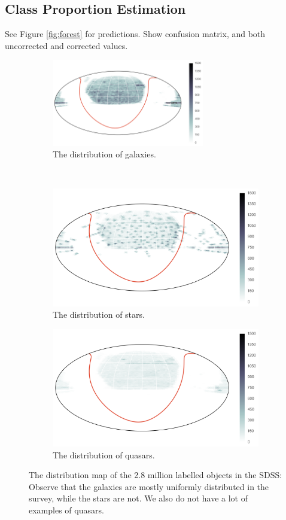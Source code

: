 \subsection{Class Proportion Estimation}
See Figure \ref{fig:forest} for predictions. Show confusion matrix, and
both uncorrected and corrected values.

\begin{figure}[p]
	\centering
	\begin{subfigure}{\textwidth}
		\centering
		\includegraphics[width=0.73\textwidth]{figures/4_expt1/sdss_train_galaxies}
		\caption{The distribution of galaxies.}
		\label{fig:training_g}
	\end{subfigure}\\
	\begin{subfigure}{\textwidth}
		\centering
		\includegraphics[width=0.73\linewidth]{figures/4_expt1/sdss_train_stars}
		\caption{The distribution of stars.}
		\label{fig:training_s}
	\end{subfigure}
	\begin{subfigure}{\textwidth}
		\centering
		\includegraphics[width=0.73\linewidth]{figures/4_expt1/sdss_train_quasars}
		\caption{The distribution of quasars.}
		\label{fig:training_q}
	\end{subfigure}
	\caption[Distribution map of labelled objects in the SDSS]{The distribution map of
		the 2.8 million labelled objects in the SDSS: Observe that the
		galaxies are mostly uniformly distributed in the survey, while the stars are not.
		We also do not have a lot of examples of quasars.}
	\label{fig:training_dist}
\end{figure}


